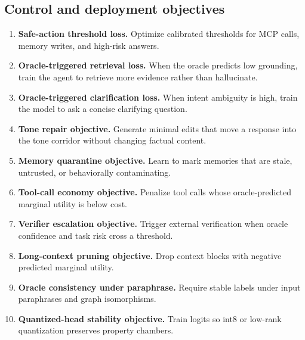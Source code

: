 \documentclass[11pt]{article}
\numberwithin{equation}{section}
\begin{document}
\subsection{Control and deployment objectives}
\begin{enumerate}[resume]
\item \textbf{Safe-action threshold loss.} Optimize calibrated thresholds for MCP calls, memory writes, and high-risk answers.
\item \textbf{Oracle-triggered retrieval loss.} When the oracle predicts low grounding, train the agent to retrieve more evidence rather than hallucinate.
\item \textbf{Oracle-triggered clarification loss.} When intent ambiguity is high, train the model to ask a concise clarifying question.
\item \textbf{Tone repair objective.} Generate minimal edits that move a response into the tone corridor without changing factual content.
\item \textbf{Memory quarantine objective.} Learn to mark memories that are stale, untrusted, or behaviorally contaminating.
\item \textbf{Tool-call economy objective.} Penalize tool calls whose oracle-predicted marginal utility is below cost.
\item \textbf{Verifier escalation objective.} Trigger external verification when oracle confidence and task risk cross a threshold.
\item \textbf{Long-context pruning objective.} Drop context blocks with negative predicted marginal utility.
\item \textbf{Oracle consistency under paraphrase.} Require stable labels under input paraphrases and graph isomorphisms.
\item \textbf{Quantized-head stability objective.} Train logits so int8 or low-rank quantization preserves property chambers.
\end{enumerate}
\end{document}
